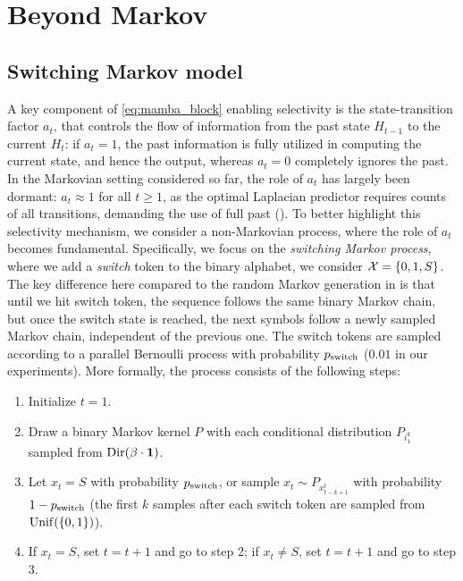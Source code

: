 
\section{Beyond Markov}
\label{sec:beyond}

\subsection{Switching Markov model}
\label{sec:switch}
A key component of \ref{eq:mamba_block} enabling selectivity is the state-transition factor $a_t$, that controls the flow of information from the past state $H_{t-1}$ to the current $H_t$: if $a_t=1$, the past information is fully utilized in computing the current state, and hence the output, whereas $a_t=0$ completely ignores the past. In the Markovian setting considered so far, the role of $a_t$ has largely been dormant: $a_t \approx 1$ for all $t\geq 1$, as the optimal Laplacian predictor requires counts of all transitions, demanding the use of full past (). To better highlight this selectivity mechanism, we consider a non-Markovian process, where the role of $a_t$ becomes fundamental. Specifically, we focus on the \emph{switching Markov process}, where we add a \emph{switch} token to the binary alphabet, \ie we consider $\mathcal{X} = \{0,1,S\}$. The key difference here compared to the random Markov generation in  is that until we hit switch token, the sequence follows the same binary Markov chain, but once the switch state is reached, the next symbols follow a newly sampled Markov chain, independent of the previous one. The switch tokens are sampled according to a parallel \iid Bernoulli process with probability $p_{\rm switch}$ ($0.01$ in our experiments). More formally, the process consists of the following steps:
\begin{enumerate}
    \item Initialize $t=1$.
    \vspace{-0.5em}
    \item Draw a binary Markov kernel $P$ with each conditional distribution $P_{i_1^k}$ sampled \iid from $\mathrm{Dir}(\beta \cdot \bm{1})$.
    \vspace{-0.5em}
    \item Let $x_t = S$ with probability $p_{\rm switch}$, or sample $x_{t} \sim P_{x_{t-k+1}^t}$ with probability $1 - p_{\rm switch}$ (the first $k$ samples after each switch token are sampled from $\mathrm{Unif}(\{0,1\})$).
    \vspace{-0.5em}
    \item If $x_t = S$, set $t = t+1$ and go to step 2; if $x_t \neq S$, set $t = t+1$ and go to step 3.
\end{enumerate}

